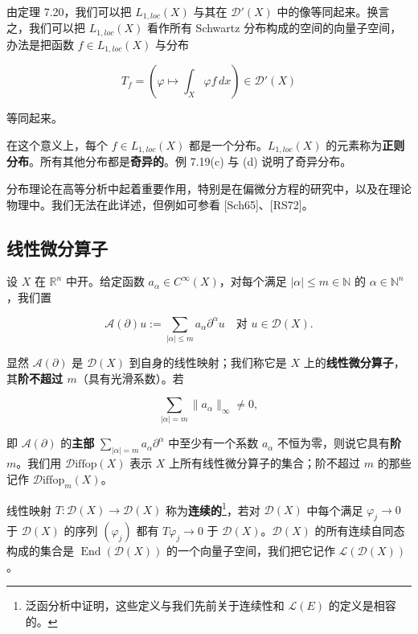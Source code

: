 由定理 7.20，我们可以把 $ L_{1,loc}(X) $ 与其在 $ \mathcal{D}'(X) $ 中的像等同起来。换言之，我们可以把 $ L_{1,loc}(X) $ 看作所有 Schwartz 分布构成的空间的向量子空间，办法是把函数 $ f \in L_{1,loc}(X) $ 与分布

\[
T_{f} = \left(\varphi \mapsto \int_{X}\varphi f\,dx\right) \in \mathcal{D}'(X)
\]

等同起来。

在这个意义上，每个 $ f \in L_{1,loc}(X) $ 都是一个分布。$ L_{1,loc}(X) $ 的元素称为\textbf{正则分布}。所有其他分布都是\textbf{奇异的}。例 7.19(c) 与 (d) 说明了奇异分布。

分布理论在高等分析中起着重要作用，特别是在偏微分方程的研究中，以及在理论物理中。我们无法在此详述，但例如可参看 [Sch65]、[RS72]。

\subsection*{线性微分算子}

设 $ X $ 在 $ \mathbb{R}^{n} $ 中开。给定函数 $ a_{\alpha} \in C^{\infty}(X) $，对每个满足 $ |\alpha| \le m \in \mathbb{N} $ 的 $ \alpha \in \mathbb{N}^{n} $，我们置

\[
\mathcal{A}(\partial)u := \sum_{|\alpha|\le m}a_{\alpha}\partial^{\alpha}u \quad \text{对 } u \in \mathcal{D}(X) .
\]

显然 $ \mathcal{A}(\partial) $ 是 $ \mathcal{D}(X) $ 到自身的线性映射；我们称它是 $ X $ 上的\textbf{线性微分算子}，其\textbf{阶不超过 $ m $}（具有光滑系数）。若

\[
\sum_{|\alpha|=m}\|a_{\alpha}\|_{\infty} \ne 0 ,
\]

即 $ \mathcal{A}(\partial) $ 的\textbf{主部} $ \sum_{|\alpha|=m}a_{\alpha}\partial^{\alpha} $ 中至少有一个系数 $ a_{\alpha} $ 不恒为零，则说它具有\textbf{阶 $ m $}。我们用 $ \mathcal{D}\mathrm{iffop}(X) $ 表示 $ X $ 上所有线性微分算子的集合；阶不超过 $ m $ 的那些记作 $ \mathcal{D}\mathrm{iffop}_{m}(X) $。

线性映射 $ T : \mathcal{D}(X) \to \mathcal{D}(X) $ 称为\textbf{连续的}\footnote{泛函分析中证明，这些定义与我们先前关于连续性和 $ \mathcal{L}(E) $ 的定义是相容的。}，若对 $ \mathcal{D}(X) $ 中每个满足 $ \varphi_{j} \to 0 $ 于 $ \mathcal{D}(X) $ 的序列 $ (\varphi_{j}) $ 都有 $ T\varphi_{j} \to 0 $ 于 $ \mathcal{D}(X) $。$ \mathcal{D}(X) $ 的所有连续自同态构成的集合是 $ \operatorname{End}(\mathcal{D}(X)) $ 的一个向量子空间，我们把它记作 $ \mathcal{L}(\mathcal{D}(X)) $。

